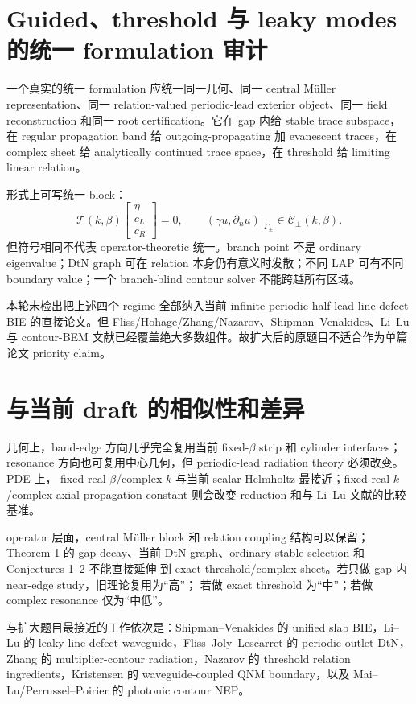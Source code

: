 \documentclass[UTF8,11pt,fontset=none]{ctexart}
\begin{document}
\section{Guided、threshold 与 leaky modes 的统一 formulation 审计}

一个真实的统一 formulation 应统一同一几何、同一 central Müller representation、同一
relation-valued periodic-lead exterior object、同一 field reconstruction 和同一 root
certification。它在 gap 内给 stable trace subspace，在 regular propagation band 给
outgoing-propagating 加 evanescent traces，在 complex sheet 给 analytically continued
trace space，在 threshold 给 limiting linear relation。

形式上可写统一 block：
\[
  \mathcal T(k,\beta)
  \begin{bmatrix}\eta\\c_L\\c_R\end{bmatrix}=0,
  \qquad
  (\gamma u,\partial_n u)|_{\Gamma_\pm}\in\mathcal C_\pm(k,\beta).
\]
但符号相同不代表 operator-theoretic 统一。branch point 不是 ordinary eigenvalue；DtN
graph 可在 relation 本身仍有意义时发散；不同 LAP 可有不同 boundary value；一个
branch-blind contour solver 不能跨越所有区域。

本轮未检出把上述四个 regime 全部纳入当前 infinite periodic-half-lead line-defect BIE
的直接论文。但 Fliss/Hohage/Zhang/Nazarov、Shipman--Venakides、Li--Lu 与 contour-BEM
文献已经覆盖绝大多数组件。故扩大后的原题目不适合作为单篇论文 priority claim。

\section{与当前 draft 的相似性和差异}

几何上，band-edge 方向几乎完全复用当前 fixed-\(\beta\) strip 和 cylinder interfaces；
resonance 方向也可复用中心几何，但 periodic-lead radiation theory 必须改变。PDE 上，
fixed real \(\beta\)/complex \(k\) 与当前 scalar Helmholtz 最接近；fixed real \(k\)/complex
axial propagation constant 则会改变 reduction 和与 Li--Lu 文献的比较基准。

operator 层面，central Müller block 和 relation coupling 结构可以保留；Theorem 1 的
gap decay、当前 DtN graph、ordinary stable selection 和 Conjectures 1--2 不能直接延伸
到 exact threshold/complex sheet。若只做 gap 内 near-edge study，旧理论复用为“高”；
若做 exact threshold 为“中”；若做 complex resonance 仅为“中低”。

与扩大题目最接近的工作依次是：Shipman--Venakides 的 unified slab BIE，Li--Lu 的
leaky line-defect waveguide，Fliss--Joly--Lescarret 的 periodic-outlet DtN，Zhang 的
multiplier-contour radiation，Nazarov 的 threshold relation ingredients，Kristensen 的
waveguide-coupled QNM boundary，以及 Mai--Lu/Perrussel--Poirier 的 photonic contour NEP。
\end{document}
